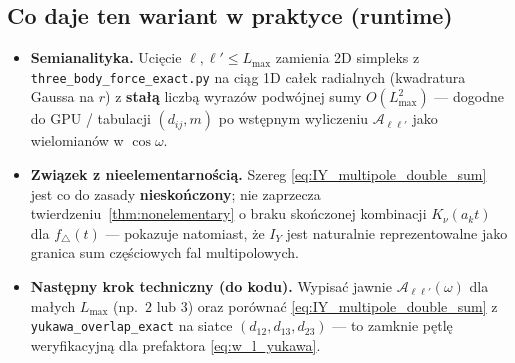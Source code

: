 \subsection{Co daje ten wariant w praktyce (runtime)}

\begin{itemize}
\item \textbf{Semianalityka.} Uci\k{e}cie $\ell,\ell'\le L_{\max}$ zamienia 2D
simpleks z \texttt{three\_body\_force\_exact.py} na ci\k{a}g 1D ca\l{}ek
radialnych (kwadratura Gaussa na $r$) z \textbf{sta\l{}\k{a}} liczb\k{a}
wyraz\'ow podw\'ojnej sumy $O(L_{\max}^2)$ --- dogodne do GPU / tabulacji
$(d_{ij},m)$ po wst\k{e}pnym wyliczeniu $\mathcal{A}_{\ell\ell'}$ jako
wielomian\'ow w $\cos\omega$.
\item \textbf{Zwi\k{a}zek z nieelementarno\'sci\k{a}.} Szereg
\eqref{eq:IY_multipole_double_sum} jest co do zasady \textbf{niesko\'nczony};
nie zaprzecza twierdzeniu~\ref{thm:nonelementary} o braku sko\'nczonej
kombinacji $K_\nu(a_k t)$ dla $f_\triangle(t)$ --- pokazuje natomiast, \.{z}e
$I_Y$ jest naturalnie reprezentowalne jako granica sum cz\k{e}\'{s}ciowych
fal multipolowych.
\item \textbf{Nast\k{e}pny krok techniczny (do kodu).} Wypisa\'c jawnie
$\mathcal{A}_{\ell\ell'}(\omega)$ dla ma\l{}ych $L_{\max}$ (np.\ $2$ lub $3$)
oraz por\'owna\'c \eqref{eq:IY_multipole_double_sum} z
\texttt{yukawa\_overlap\_exact} na siatce $(d_{12},d_{13},d_{23})$ --- to
zamknie p\k{e}tl\k{e} weryfikacyjn\k{a} dla prefaktora \eqref{eq:w_l_yukawa}.
\end{itemize}
